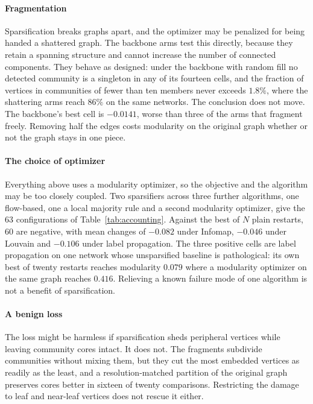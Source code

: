 \paragraph{Fragmentation}
Sparsification breaks graphs apart, and the optimizer may be penalized for being
handed a shattered graph. The backbone arms test this directly, because they
retain a spanning structure and cannot increase the number of connected
components. They behave as designed: under the backbone with random fill no
detected community is a singleton in any of its fourteen cells, and the fraction
of vertices in communities of fewer than ten members never exceeds $1.8\%$,
where the shattering arms reach $86\%$ on the same networks. The conclusion does
not move. The backbone's best cell is $-0.0141$, worse than three of the arms that
fragment freely. Removing half the edges costs modularity on the original graph
whether or not the graph stays in one piece.

\paragraph{The choice of optimizer}
Everything above uses a modularity optimizer, so the objective and the algorithm
may be too closely coupled. Two sparsifiers across three further algorithms, one
flow-based, one a local majority rule and a second modularity optimizer, give the
63 configurations of Table~\ref{tab:accounting}. Against the best of $N$ plain
restarts, 60 are negative, with mean changes of $-0.082$ under Infomap, $-0.046$
under Louvain and $-0.106$ under label propagation. The three positive cells are
label propagation on one network whose unsparsified baseline is pathological: its
own best of twenty restarts reaches modularity $0.079$ where a modularity
optimizer on the same graph reaches $0.416$. Relieving a known failure mode of one
algorithm is not a benefit of sparsification.

\paragraph{A benign loss}
The loss might be harmless if sparsification sheds peripheral vertices while
leaving community cores intact. It does not. The fragments subdivide communities
without mixing them, but they cut the most embedded vertices as readily as the
least, and a resolution-matched partition of the original graph preserves cores
better in sixteen of twenty comparisons. Restricting the damage to leaf and
near-leaf vertices does not rescue it either.

